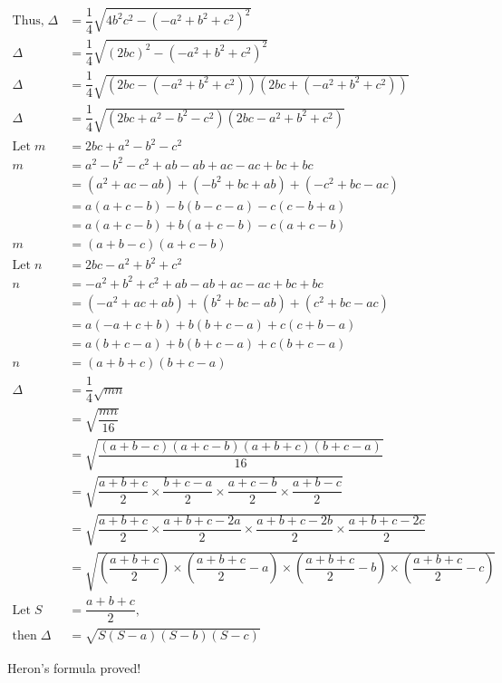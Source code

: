 \documentclass[
]{book}
\begin{document}
\[
\begin{aligned}
\text{Thus,}\; \Delta &= \dfrac{1}{4} \sqrt{4b^2c^2 - (-a^2 + b^2 + c^2)^2} \\
\Delta &= \dfrac{1}{4} \sqrt{(2bc)^2 - (-a^2 + b^2 + c^2)^2} \\
\Delta &= \dfrac{1}{4} \sqrt{(2bc - (-a^2 + b^2 + c^2))(2bc + (-a^2 + b^2 + c^2))} \\
\Delta &= \dfrac{1}{4} \sqrt{(2bc + a^2 - b^2 - c^2)(2bc - a^2 + b^2 + c^2)} \\
\text{Let}\; m &= 2bc + a^2 - b^2 - c^2 \\
m &= a^2 - b^2 - c^2 + ab - ab + ac - ac + bc + bc \\
&= (a^2 + ac - ab) + (-b^2 + bc + ab) + (-c^2 + bc - ac) \\
&= a(a + c - b) - b(b - c - a) - c(c - b + a) \\
&= a(a + c - b) + b(a + c - b) - c(a + c - b) \\
m &= (a + b - c)(a + c - b) \\
\text{Let}\; n &= 2bc - a^2 + b^2 + c^2 \\
n &= -a^2 + b^2 + c^2 + ab - ab + ac - ac + bc + bc \\
&= (-a^2 + ac + ab) + (b^2 + bc - ab) + (c^2 + bc - ac) \\
&= a(-a + c + b) + b(b + c - a) + c(c + b - a) \\
&= a(b + c - a) + b(b + c - a) + c(b + c - a) \\
n &= (a + b + c)(b + c - a) \\
\Delta &= \dfrac{1}{4} \sqrt{mn} \\
&= \sqrt{\dfrac{mn}{16}} \\
&= \sqrt{\dfrac{(a + b - c)(a + c - b)(a + b + c)(b + c - a)}{16}} \\
&= \sqrt{\dfrac{a + b + c}{2} \times \dfrac{b + c - a}{2} \times \dfrac{a + c - b}{2} \times \dfrac{a + b - c}{2}} \\
&= \sqrt{\dfrac{a + b + c}{2} \times \dfrac{a + b + c - 2a}{2} \times \dfrac{a + b + c - 2b}{2} \times \dfrac{a + b + c - 2c}{2}} \\
&= \sqrt{\left(\dfrac{a + b + c}{2}\right) \times \left(\dfrac{a + b + c}{2} - a\right) \times \left(\dfrac{a + b + c}{2} - b\right) \times \left(\dfrac{a + b + c}{2} - c\right)} \\
\text{Let}\; S &= \dfrac{a + b + c}{2}, \\
\text{then}\; \Delta &= \sqrt{S(S - a)(S - b)(S - c)}
\end{aligned}
\]

\hfill\break
Heron's formula proved!


\end{document}
